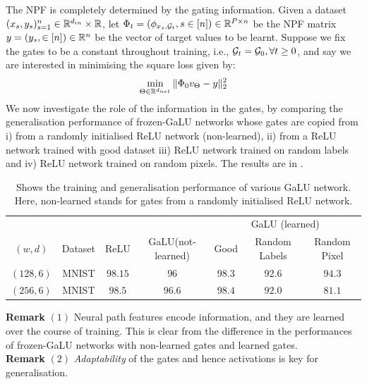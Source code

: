 The NPF is completely determined by the gating information. Given a dataset $(x_s,y_s)_{s=1}^n\in \mathbb{R}^{d_{in}}\times \mathbb{R}$, let $\Phi_{t}=(\phi_{x_s,\mathcal{G}_t},s\in[n] )\in \mathbb{R}^{P\times n}$ be the NPF matrix  $y=(y_s,\in[n])\in\mathbb{R}^n$ be the vector of target values to be learnt. Suppose we fix the gates to be a constant throughout training, i.e., $\mathcal{G}_t=\mathcal{G}_0,\forall t\geq 0$, and say we are interested in minimising the square loss given by:
\begin{align}\label{eq:sqloss}
\min_{\Theta\in \mathbb{R}^{d_{net}}}\|\Phi_{0}v_{\Theta}-y\|^2_2
\end{align}
We now investigate the role of the information in the gates, by comparing the generalisation performance of frozen-GaLU networks whose gates are copied from i) from a randomly initialised ReLU network (non-learned), ii) from a ReLU network trained with good dataset iii) ReLU network trained on random labels and iv) ReLU network trained on random pixels. The results are in .
\begin{table}
\begin{tabular}{|c|c|c|c|c|c|c|}\hline
&&&&\multicolumn{3}{c|}{GaLU (learned)}\\\cline{5-7}
$(w,d)$	&Dataset		&ReLU		&GaLU(not-learned) 		&Good 		&Random Labels 	&Random Pixel\\\hline
$(128,6)$	& MNIST 		& $98.15$ 		&$96$ 		&$98.3$		&$92.6$			&$94.3$\\\hline
$(256,6)$	& MNIST 		& $98.5$ 		&$96.6$ 		&$98.4$		&$92.0$			&$81.1$\\\hline
\end{tabular}
\caption{Shows the training and generalisation performance of various GaLU network. Here, non-learned stands for gates from a randomly initialised ReLU network.}
\label{tb:copygate}
\end{table}

\textbf{Remark} $(1)$ Neural path features encode information, and they are learned over the course of training. This is clear from the difference in the performances of frozen-GaLU networks with non-learned gates and learned gates.\hfill\\
\textbf{Remark} $(2)$ \emph{Adaptability} of the gates and hence activations is key for generalisation. \hfill \\

